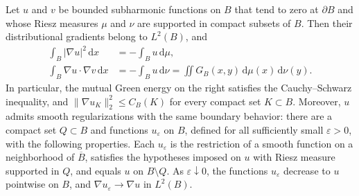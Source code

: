 \begin{proposition}\label{prop:bounded-green-energy}
Let $u$ and $v$ be bounded subharmonic functions on $B$ that tend to zero at $\partial B$ and whose Riesz measures $\mu$ and $\nu$ are supported in compact subsets of $B$. Then their distributional gradients belong to $L^2(B)$, and
\[
 \begin{aligned}
 \int_B|\nabla u|^2\,\mathrm d x&=-\int_Bu\,\mathrm d\mu,\\
 \int_B\nabla u\mathbin{\cdot}\nabla v\,\mathrm d x&=-\int_Bu\,\mathrm d\nu
 =\iint G_B(x,y)\,\mathrm d\mu(x)\,\mathrm d\nu(y).
 \end{aligned}
\]
In particular, the mutual Green energy on the right satisfies the Cauchy--Schwarz inequality, and $\|\nabla u_K\|_2^2\leq C_B(K)$ for every compact set $K\subset B$. Moreover, $u$ admits smooth regularizations with the same boundary behavior: there are a compact set $Q\subset B$ and functions $u_\varepsilon$ on $B$, defined for all sufficiently small $\varepsilon>0$, with the following properties. Each $u_\varepsilon$ is the restriction of a smooth function on a neighborhood of $\overline B$, satisfies the hypotheses imposed on $u$ with Riesz measure supported in $Q$, and equals $u$ on $B\setminus Q$. As $\varepsilon\downarrow0$, the functions $u_\varepsilon$ decrease to $u$ pointwise on $B$, and $\nabla u_\varepsilon\to\nabla u$ in $L^2(B)$.
\end{proposition}
